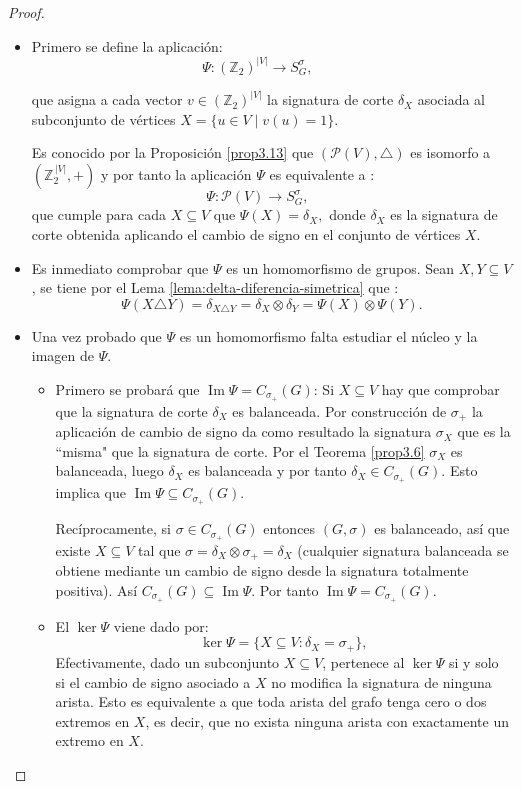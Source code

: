\documentclass[11pt,a4paper,spanish]{report}
\theoremstyle{plain}
\begin{document}
\begin{proof}
\begin{itemize}

\item Primero se define la aplicación:
\[
\Psi:(\mathbb{Z}_2)^{|V|}\longrightarrow S^\sigma_G,\qquad 
\]

que asigna a cada vector $v \in (\mathbb{Z}_2)^{|V|}$ la signatura de corte $\delta_{X}$ asociada al subconjunto de vértices $X = \{u \in V \mid v(u) = 1\}$.


Es conocido por la Proposición \ref{prop3.13} que $(\mathcal{P}(V),\triangle)$ es isomorfo a $(\mathbb{Z}_2^{\,|V|},+)$ y por tanto la aplicación $\Psi$ es equivalente a : 
\[
\Psi:\mathcal{P}(V)\longrightarrow S^\sigma_G,\qquad 
\]
  que cumple para cada $X\subseteq V$ que
$\Psi(X)=\delta_X,$
donde \(\delta_X\) es la signatura de corte obtenida aplicando el cambio de signo en el conjunto de vértices \(X\).

\item Es inmediato comprobar que \(\Psi\) es un homomorfismo de grupos. Sean $X,Y\subseteq V$, se tiene por el Lema \ref{lema:delta-diferencia-simetrica} que :
\[ \Psi(X\triangle Y)=\delta_{X\triangle Y}=\delta_X\otimes\delta_Y=\Psi(X)\otimes\Psi(Y).
\]
\item Una vez probado que $\Psi$ es un homomorfismo falta estudiar el núcleo y la imagen de $\Psi$.
\begin{itemize}
    
\item Primero se probará que \(\operatorname{Im}\Psi= C_{\sigma_+}(G)\):  
Si \(X\subseteq V\) hay que comprobar que la signatura de corte  $\delta_X$ es balanceada. Por construcción de $\sigma_{+}$ la aplicación de cambio de signo da como resultado la signatura $\sigma_X$ que es la ``misma"  que la signatura de corte. Por el Teorema \ref{prop3.6} $\sigma_X$ es balanceada, luego $\delta_X$ es balanceada y por tanto \(\delta_X\in  C_{\sigma_+}(G)\). Esto implica que \(\operatorname{Im}\Psi\subseteq  C_{\sigma_+}(G)\).  

Recíprocamente, si \(\sigma\in  C_{\sigma_+}(G)\) entonces \((G,\sigma)\) es balanceado, así que existe \(X\subseteq V\) tal que \(\sigma=\delta_X\otimes \sigma_+=\delta_X\) (cualquier signatura balanceada se obtiene mediante un cambio de signo desde la signatura totalmente positiva). Así \( C_{\sigma_+}(G)\subseteq\operatorname{Im}\Psi\). Por tanto \(\operatorname{Im}\Psi= C_{\sigma_+}(G)\).

\item El $\ker\Psi$ viene dado por:
\[
\ker\Psi=\{X\subseteq V:\delta_X=\sigma_+\},
\]
Efectivamente, dado un subconjunto \(X \subseteq V\), pertenece al \(\ker \Psi\) si y solo si
el cambio de signo asociado a \(X\) no modifica la signatura de ninguna arista.
Esto es equivalente a que toda arista del grafo tenga cero o dos extremos en \(X\),
es decir, que no exista ninguna arista con exactamente un extremo en \(X\).


\end{itemize}
\end{itemize}
\end{proof}
\end{document}
